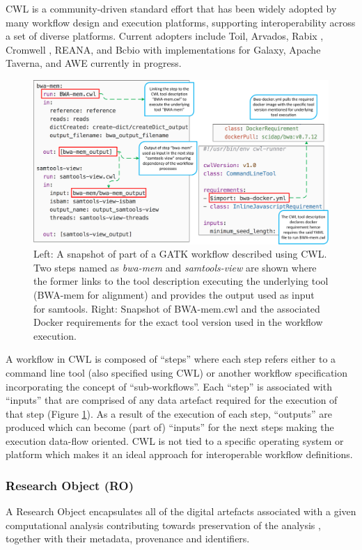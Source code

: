 \documentclass[a4paper,num-refs]{oup-contemporary}
\begin{document}
CWL is a community-driven standard effort that has been widely adopted by many workflow design and execution platforms, supporting interoperability across a set of diverse platforms. Current adopters include Toil, Arvados, Rabix \citep{kaushik_2017}, Cromwell \citep{cromwell}, REANA, and Bcbio \citep{guimera_2012} with implementations for Galaxy, Apache Taverna, and AWE currently in progress. 
\begin{figure} [t!] 
\centering
    \includegraphics[width=.7\textwidth]{images/twostep}
    \captionsetup{justification=centering}
\caption{Left: A snapshot of part of a GATK workflow described using CWL. Two steps named as \textit{bwa-mem} and \textit{samtools-view} are shown where the former links to the tool description executing the underlying tool (BWA-mem for alignment) and provides the output used as input for samtools. Right: Snapshot of BWA-mem.cwl and the associated Docker requirements for the exact tool version used in the workflow execution.}\label{fig:bwa-mem}
\end{figure}

A workflow in CWL is composed of “steps” where each step refers either to a command line tool (also specified using CWL) or another workflow specification incorporating the concept of “sub-workflows”. Each “step” is associated with “inputs” that are comprised of any data artefact required for the execution of that step (Figure \ref{fig:bwa-mem}). As a result of the execution of each step, “outputs” are produced which can become (part of) “inputs” for the next steps making the execution data-flow oriented. CWL is not tied to a specific operating system or platform which makes it an ideal approach for interoperable workflow definitions. 

\subsubsection{ \textcolor{black}Research Object (RO)}
A Research Object encapsulates all of the digital artefacts associated with a given computational analysis contributing towards preservation of the analysis \citep{bechhofer_2013}, together with their metadata, provenance and identifiers.
\end{document}
